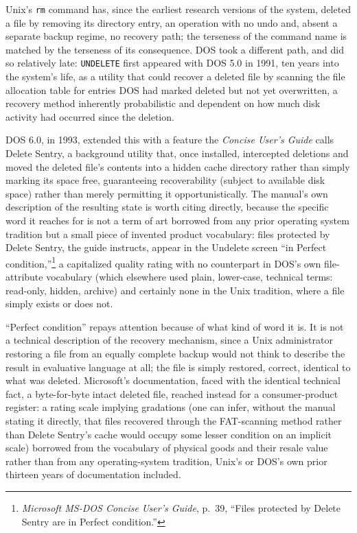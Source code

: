 \documentclass[11pt]{book}
\begin{document}
Unix's \texttt{rm} command has, since the earliest research versions of the system, deleted a file by removing its directory entry, an operation with no undo and, absent a separate backup regime, no recovery path; the terseness of the command name is matched by the terseness of its consequence. DOS took a different path, and did so relatively late: \texttt{UNDELETE} first appeared with DOS 5.0 in 1991, ten years into the system's life, as a utility that could recover a deleted file by scanning the file allocation table for entries DOS had marked deleted but not yet overwritten, a recovery method inherently probabilistic and dependent on how much disk activity had occurred since the deletion.

DOS 6.0, in 1993, extended this with a feature the \emph{Concise User's Guide} calls Delete Sentry, a background utility that, once installed, intercepted deletions and moved the deleted file's contents into a hidden cache directory rather than simply marking its space free, guaranteeing recoverability (subject to available disk space) rather than merely permitting it opportunistically. The manual's own description of the resulting state is worth citing directly, because the specific word it reaches for is not a term of art borrowed from any prior operating system tradition but a small piece of invented product vocabulary: files protected by Delete Sentry, the guide instructs, appear in the Undelete screen \enquote{in Perfect condition,}\footnote{\emph{Microsoft MS-DOS Concise User's Guide}, p.\ 39, ``Files protected by Delete Sentry are in Perfect condition.''} a capitalized quality rating with no counterpart in DOS's own file-attribute vocabulary (which elsewhere used plain, lower-case, technical terms: read-only, hidden, archive) and certainly none in the Unix tradition, where a file simply exists or does not.

\enquote{Perfect condition} repays attention because of what kind of word it is. It is not a technical description of the recovery mechanism, since a Unix administrator restoring a file from an equally complete backup would not think to describe the result in evaluative language at all; the file is simply restored, correct, identical to what was deleted. Microsoft's documentation, faced with the identical technical fact, a byte-for-byte intact deleted file, reached instead for a consumer-product register: a rating scale implying gradations (one can infer, without the manual stating it directly, that files recovered through the FAT-scanning method rather than Delete Sentry's cache would occupy some lesser condition on an implicit scale) borrowed from the vocabulary of physical goods and their resale value rather than from any operating-system tradition, Unix's or DOS's own prior thirteen years of documentation included.
\end{document}
